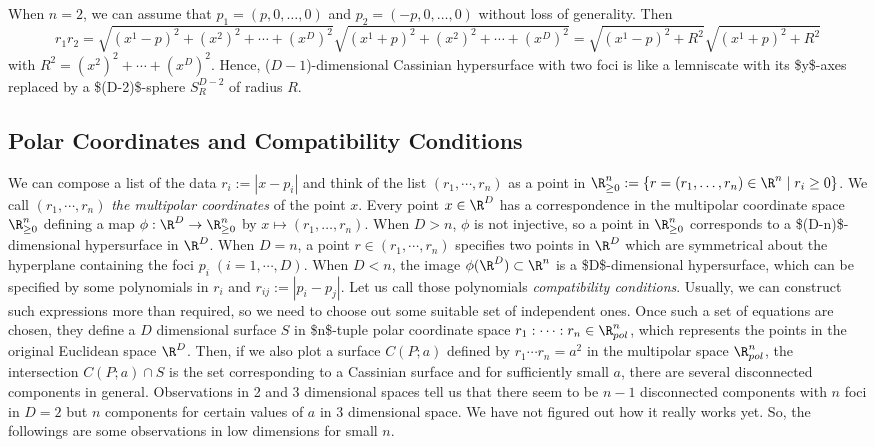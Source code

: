\documentclass{article}
\begin{document}
When \(n=2\), we can assume that \(p_1 = (p,0,\dots,0)\) and \(p_2 = (-p,0,\dots,0)\) without loss of generality. Then
\begin{equation}
\label{ }
r_1r_2 = \sqrt{(x^1-p)^2 + (x^2)^2 + \cdots + (x^D)^2}\sqrt{(x^1+p)^2 + (x^2)^2 + \cdots + (x^D)^2} = \sqrt{(x^1-p)^2 + R^2}\sqrt{(x^1+p)^2 + R^2}
\end{equation}
with \(R^2 = (x^2)^2 + \cdots + (x^D)^2\). Hence, (\(D-1\))-dimensional Cassinian hypersurface with two foci is like a lemniscate with its \$y\$-axes replaced by a \$(D-2)\$-sphere \(S_R^{D-2}\) of radius \(R\).

\subsection{Polar Coordinates and Compatibility Conditions}
\label{sec:org2ca5f3c}
We can compose a list of the data \(r_i := |x-p_i|\) and think of the list \((r_1,\cdots,r_n)\) as a point in \(\R^n_{\ge0}:= \left\{r=(r_{1},\dots,r_{n}) \in \R^{n}\mid r_{i}\ge0\right\}\). 
We call \((r_1,\cdots,r_n)\) \emph{the multipolar coordinates} of the point \(x\). 
Every point \(x \in \R^D\) has a correspondence in the multipolar coordinate space \(\R^n_{\ge0}\) defining a map \(\phi:\R^D \rightarrow \R^n_{\ge0}\) by \(x \mapsto (r_{1},\dots,r_{n})\). 
When \(D>n\), \(\phi\) is not injective, so a point in \(\R^n_{\ge0}\) corresponds to a \$(D-n)\$-dimensional hypersurface in \(\R^{D}\). 
When \(D=n\), a point \(r \in (r_1, \cdots,r_n)\) specifies two points in \(\R^D\) which are symmetrical about the hyperplane containing the foci \(p_i \;(i=1,\cdots,D)\). 
When \(D<n\), the image \(\phi(\R^D) \subset \R^n\) is a \$D\$-dimensional hypersurface, which can be specified by some polynomials in \(r_i\) and \(r_{ij}:=|p_{i}-p_{j}|\). 
Let us call those polynomials \emph{compatibility conditions}. Usually, we can construct such expressions more than required, so we need to choose out some suitable set of independent ones. 
Once such a set of equations are chosen, they define a \(D\) dimensional surface \(S\) in \$n\$-tuple polar coordinate space \(r_1:\cdots:r_n \in \R_{pol}^n\), which represents the points in the original Euclidean space \(\R^D\). 
Then, if we also plot a surface \(C(P;a)\) defined by \(r_1\cdots r_n = a^2\) in the multipolar space \(\R_{pol}^n\), the intersection \(C(P;a) \cap S\) is the set corresponding to a Cassinian surface and for sufficiently small \(a\), there are several disconnected components in general. 
Observations in 2 and 3 dimensional spaces tell us that there seem to be \(n-1\) disconnected components with \(n\) foci in \(D=2\) but \(n\) components for certain values of \(a\) in 3 dimensional space. 
We have not figured out how it really works yet. So, the followings are some observations in low dimensions for small \(n\).
\end{document}
